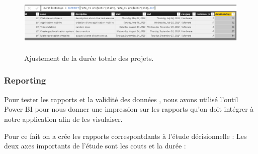 \bigskip
\bigskip

\FloatBarrier
\begin{figure}[H]
\center
\includegraphics[width=14cm,height=3cm]{./figures/pb2.png}
\caption{Ajustement de la dur\'{e}e totale des projets.}
\end{figure}
\FloatBarrier

\newpage
\subsubsection{Reporting }
Pour tester les rapports et la validit\'{e} des donn\'{e}es , nous avons utilis\'{e} l'outil
Power BI pour nous donner une impression sur les rapports qu'on doit
int\'{e}grer \`{a} notre application afin de les visulaiser.

\bigskip
Pour ce fait on a cr\'{e}e les rapports correspontdants \`{a} l'\'{e}tude d\'{e}cisionnelle :
Les deux axes importants de l'\'{e}tude sont les couts et la dur\'{e}e :



